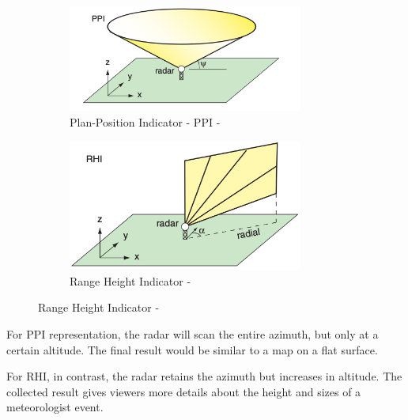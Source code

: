 \begin{figure}[htp!]
    \centering
    \begin{subfigure}{\textwidth}
        \centering
        \includegraphics[width=0.85\textwidth]{Images/2.1-ppi.png}
        \caption{Plan-Position Indicator - PPI - \cite{2022Weather}}
        \label{fig:ppi}
    \end{subfigure}

    \begin{subfigure}{\textwidth}
        \centering
        \includegraphics[width=0.85\textwidth]{Images/2.1-rhi.png}
        \caption{Range Height Indicator - \cite{2022Weather}}
        \label{fig:rhi}
    \end{subfigure}

\end{figure}

For PPI representation, the radar will scan the entire azimuth, but only at a certain altitude.
The final result would be similar to a map on a flat surface.

For RHI, in contrast, the radar retains the azimuth but increases in altitude.
The collected result gives viewers more details about the height and sizes of a meteorologist event.

